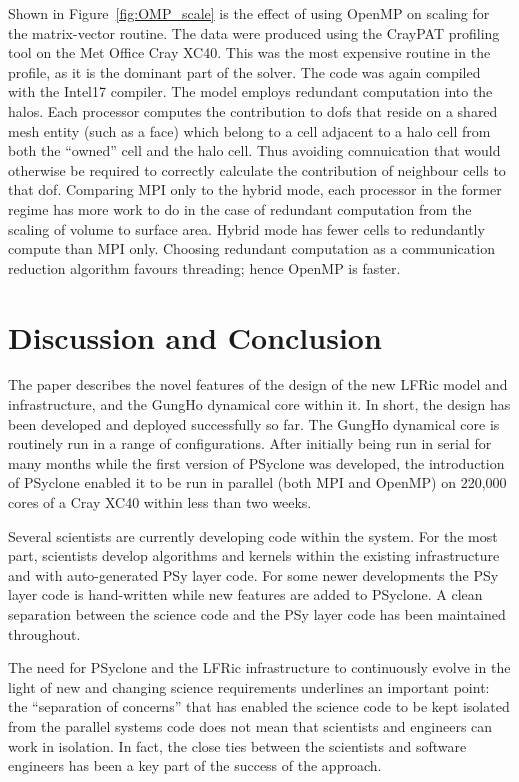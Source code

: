 \documentclass[review,times]{elsarticle}
\begin{document}
Shown in Figure~\ref{fig:OMP_scale} is the effect of using OpenMP on 
scaling for the matrix-vector routine. The data were produced using
the CrayPAT profiling tool on the Met Office Cray XC40. This was the
most expensive routine in the profile, as it is the dominant part of
the solver. The code was
again compiled with the Intel17 compiler. The model employs redundant
computation into the halos. Each processor computes the contribution
to dofs that reside on a shared mesh
entity (such as a face) which belong to a cell adjacent to a halo cell
from both the ``owned'' cell and the halo cell. Thus avoiding
comnuication that would otherwise be required to correctly calculate
the contribution of neighbour cells to that dof. Comparing MPI only to
the hybrid mode, each processor in the former regime has more work to
do in the case of redundant computation from the scaling of volume to
surface area. Hybrid mode has fewer cells to redundantly compute than
MPI only. Choosing redundant computation as a communication reduction
algorithm favours threading; hence OpenMP is faster.
 

\section{Discussion and Conclusion}

The paper describes the novel features of the design of the new LFRic
model and infrastructure, and the GungHo dynamical core within it. In
short, the design has been developed and deployed successfully so
far. The GungHo dynamical core is routinely run in a range of
configurations. After initially being run in serial for many months
while the first version of PSyclone was developed, the introduction of
PSyclone enabled it to be run in parallel (both MPI and OpenMP) on
220,000 cores of a Cray XC40 within less than two weeks.

Several scientists are currently developing code within the
system. For the most part, scientists develop algorithms and kernels
within the existing infrastructure and with auto-generated PSy layer
code. For some newer developments the PSy layer code is hand-written
while new features are added to PSyclone. A clean separation between
the science code and the PSy layer code has been maintained
throughout. 

The need for PSyclone and the LFRic infrastructure to continuously
evolve in the light of new and changing science requirements
underlines an important point: the ``separation of concerns'' that has
enabled the science code to be kept isolated from the parallel systems
code does not mean that scientists and engineers can work in
isolation. In fact, the close ties between the scientists and software
engineers has been a key part of the success of the approach.
\end{document}
